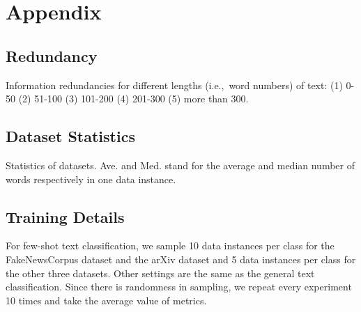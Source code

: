 \documentclass[11pt]{article}
\begin{document}



\section{Appendix}

\subsection{Redundancy}
\begin{table}
    
    \caption{Information redundancies for different lengths (i.e.,~word numbers) of text: (1) 0-50 (2) 51-100 (3) 101-200 (4) 201-300 (5) more than 300.}
    \label{redundancy}
\end{table}

\subsection{Dataset Statistics}
\begin{table}
    
    \caption{Statistics of datasets. Ave. and Med. stand for the average and median number of words respectively in one data instance.}
    \label{dataset}
\end{table}

\subsection{Training Details}

For few-shot text classification, we sample 10 data instances per class for the FakeNewsCorpus dataset and the arXiv dataset and 5 data instances per class for the other three datasets. 
Other settings are the same as the general text classification. 
Since there is randomness in sampling, we repeat every experiment 10 times and take the average value of metrics.
\end{document}
